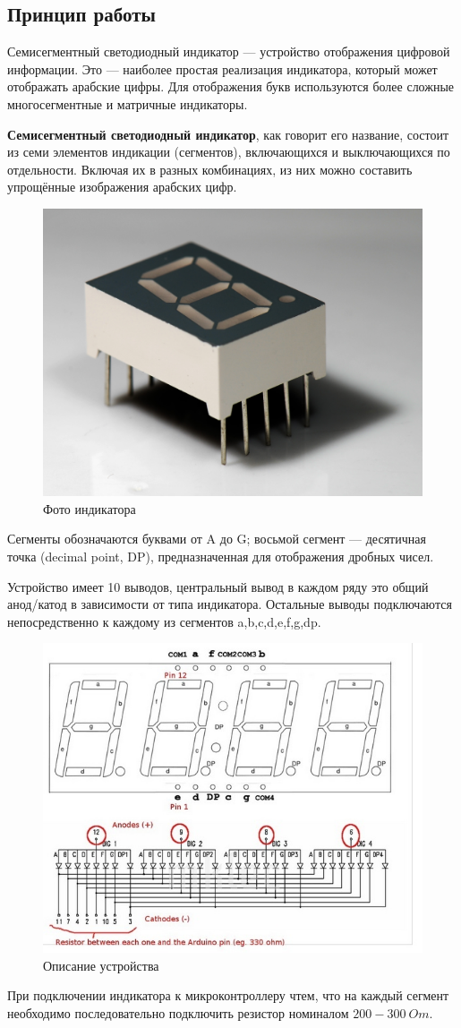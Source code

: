 \subsection{Принцип работы}
Семисегментный светодиодный индикатор — устройство отображения цифровой информации. Это — наиболее простая реализация индикатора, который может отображать арабские цифры. Для отображения букв используются более сложные многосегментные и матричные индикаторы.

\textbf{Семисегментный светодиодный индикатор}, как говорит его название, состоит из семи элементов индикации (сегментов), включающихся и выключающихся по отдельности. Включая их в разных комбинациях, из них можно составить упрощённые изображения арабских цифр.

\begin{figure}[h!]
		\centering
		\includegraphics[width=0.8\linewidth]{pics/seven_segment.png}
		\caption{Фото индикатора}
		\label{ind}
\end{figure}

Сегменты обозначаются буквами от A до G; восьмой сегмент — десятичная точка (decimal point, DP), предназначенная для отображения дробных чисел.

Устройство имеет 10 выводов, центральный вывод в каждом ряду это общий анод/катод в зависимости от типа индикатора. Остальные выводы подключаются непосредственно к каждому из сегментов a,b,c,d,e,f,g,dp.


\begin{figure}[h!]
		\centering
		\includegraphics[width=0.8\linewidth]{pics/sem_segmnt_.png}
		\caption{Описание устройства}
		\label{ind}
\end{figure}

При подключении индикатора к микроконтроллеру чтем, что на каждый сегмент необходимо последовательно подключить резистор номиналом $200-300 \: Om$.


